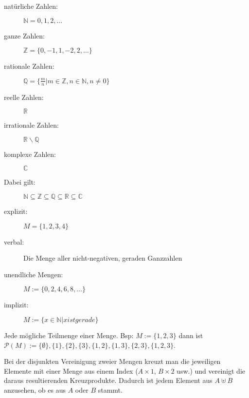 \begin{framed} [Zahlenmengen]
  \begin{description}
    \item [natürliche Zahlen:] $\mathbb{N} = {0,1,2,\dots}$
    \item [ganze Zahlen:] $\mathbb{Z} = \{0,-1,1,-2,2,\dots\}$
    \item [rationale Zahlen:] $\mathbb{Q} = \{\frac{m}{n} | m \in \mathbb{Z}, n \in \mathbb{N}, n \neq 0\}$
    \item [reelle Zahlen:] $\mathbb{R}$
    \item [irrationale Zahlen:] $\mathbb{R}\backslash \mathbb{Q}$
    \item [komplexe Zahlen:] $\mathbb{C}$
    \item [Dabei gilt:] $\mathbb{N} \subseteq \mathbb{Z} \subseteq \mathbb{Q} \subseteq \mathbb{R} \subseteq \mathbb{C}$
  \end{description}
\end{framed}

\vspace{-.6cm}

\begin{framed} 
  \begin{description}
    \item [explizit:] $M = \{1,2,3,4\}$
    \item [verbal:] \dq{}Die Menge aller nicht-negativen, geraden Ganzzahlen\dq{}
    \item [unendliche Mengen:] $M := \{0,2,4,6,8,\dots\}$
    \item [implizit:] $M := \{x \in \mathbb{N} | x ist gerade\}$
  \end{description}
\end{framed}

\vspace{-.6cm}

\begin{framed} [Potenzmenge:] 
  Jede mögliche Teilmenge einer Menge. Bsp: $M := \{1,2,3\}$ dann ist
  $\mathcal{P}(M) := \{\emptyset\},\{1\},\{2\},\{3\},\{1,2\},\{1,3\},\{2,3\},\{1,2,3\}$.
\end{framed}

\vspace{-.6cm}

\begin{framed}  
    Bei der disjunkten Vereinigung zweier Mengen kreuzt man die jeweiligen 
    Elemente mit einer Menge aus einem Index ($A \times {1}$, $B \times {2}$ usw.) 
    und vereinigt die daraus resultierenden Kreuzprodukte. 
    Dadurch ist jedem Element aus $A \uplus B$ anzusehen, ob es aus $A$ oder $B$ 
    stammt.
\end{framed}
